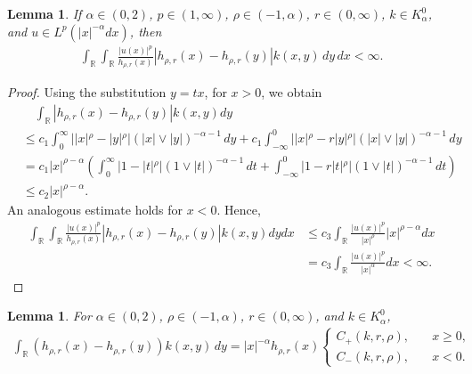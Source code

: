\documentclass[12pt, a4paper]{amsart}
\newtheorem{lemma}[theorem]{Lemma}
\newcommand{\R}{\mathbb{R}}
\begin{document}
\begin{lemma}
\label{lemma: calkowalnosc h}
If $\alpha \in (0, 2)$, $p \in (1, \infty)$, $\rho \in (-1, \alpha)$, $r \in (0, \infty)$, $k \in K_\alpha^0$, and $u \in L^p(|x|^{-\alpha}dx)$, then
\begin{align*}
    \int_\R\int_\R\frac{|u(x)|^p}{h_{\rho, r}(x)}|h_{\rho, r}(x) - h_{\rho, r}(y)|k(x, y)\,dy\,dx < \infty.
\end{align*}
\end{lemma}

\begin{proof}
Using the substitution $y = tx$, for $x > 0$, we obtain
\begin{align*}
&\quad \int_{\R}|h_{\rho, r}(x) - h_{\rho, r}(y)|k(x, y)dy
\\
&\leq c_1\int_{0}^{\infty}||x|^\rho - |y|^\rho|(|x| \lor |y|)^{-\alpha - 1}\,dy 
 + c_1\int_{-\infty}^{0}||x|^\rho - r|y|^\rho|(|x| \lor |y|)^{-\alpha - 1}\,dy
\\
&= c_1|x|^{\rho - \alpha} \left( \int_{0}^{\infty}|1 - |t|^\rho|(1 \lor |t|)^{-\alpha - 1}\,dt + \int_{-\infty}^{0}|1 - r|t|^\rho|(1 \lor |t|)^{-\alpha - 1}\,dt \right)
\\
&\leq c_2|x|^{\rho - \alpha}.
\end{align*}
An analogous estimate holds for $x < 0$. Hence,
\begin{align*}
    \int_\R\int_\R\frac{|u(x)|^p}{h_{\rho, r}(x)}|h_{\rho, r}(x) - h_{\rho, r}(y)|k(x, y)dydx
    &\leq c_3\int_\R\frac{|u(x)|^p}{|x|^\rho}|x|^{\rho - \alpha}dx 
    \\
    &= c_3\int_\R\frac{|u(x)|^p}{|x|^\alpha}dx < \infty.
\end{align*}
\end{proof}

\begin{lemma}
\label{lemma: rownosc Kw}
For $\alpha \in (0, 2)$, $\rho \in (-1, \alpha)$, $r \in (0, \infty)$, and $k \in K_\alpha^0$,
\begin{align}
\label{equation: rownosc Kw}
    \int_{\R}(h_{\rho, r}(x) - h_{\rho, r}(y))k(x, y)\,dy = |x|^{-\alpha}h_{\rho, r}(x)\begin{cases}
        C_{+}(k, r, \rho), \quad &x \geq 0, \\
        C_{-}(k, r, \rho), \quad &x < 0.
    \end{cases}
\end{align}
\end{lemma}
\end{document}
